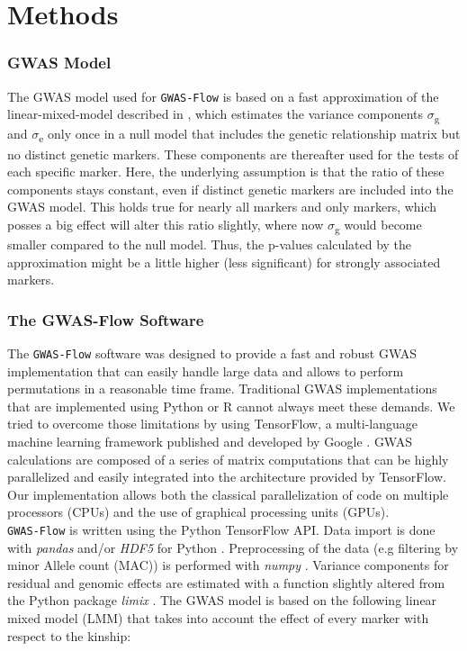 \section{Methods}

\subsubsection{GWAS Model}
The GWAS model used for \texttt{GWAS-Flow} is based on a fast approximation of the
linear-mixed-model described in \cite{kang2010variance,Zhang2010}, which estimates the
variance components $\sigma$\textsubscript{g} and $\sigma$\textsubscript{e} only once in a
null model that includes the genetic relationship matrix but no distinct genetic
markers. These components are thereafter used for the tests of each specific marker. Here,
the underlying assumption is that the ratio of these components stays constant, even if
distinct genetic markers are included into the GWAS model. This holds true for nearly all
markers and only markers, which posses a big effect will alter this ratio slightly, where
now $\sigma$\textsubscript{g} would become smaller compared to the null model. Thus, the
p-values calculated by the approximation might be a little higher (less significant) for
strongly associated markers.

\subsubsection{The GWAS-Flow Software}
The \texttt{GWAS-Flow} software was designed to provide a fast and robust GWAS
implementation that can easily handle large data and allows to perform permutations in a
reasonable time frame. Traditional GWAS implementations that are implemented using Python
\cite{van1995python} or R \cite{R} cannot always meet these demands. We tried to overcome
those limitations by using TensorFlow, a multi-language machine learning framework
published and developed by Google \cite{tensorflow2015-whitepaper}. GWAS calculations are
composed of a series of matrix computations that can be highly parallelized and easily
integrated into the architecture provided by TensorFlow. Our implementation allows both
the classical parallelization of code on multiple processors (CPUs) and the use of
graphical processing units (GPUs).\\
\texttt{GWAS-Flow} is written using the Python TensorFlow API. Data import is done with
\textit{pandas} \cite{mckinney-proc-scipy-2010} and/or \textit{HDF5} for Python
\cite{hdf5_2014}. Preprocessing of the data (e.g filtering by minor Allele count (MAC)) is
performed with \textit{numpy} \cite{oliphant2006guide}. Variance components for residual
and genomic effects are estimated with a function slightly altered from the Python package
\textit{limix} \cite{Lippert003905}. The GWAS model is based on the following linear mixed
model (LMM) that takes into account the effect of every marker with respect to the kinship:

